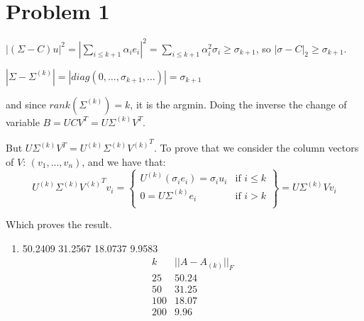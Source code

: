 \documentclass[12pt]{article}
\newenvironment{problem}[1]
{\section*{Problem #1}}{}
\begin{document}
\begin{problem}{1}
\begin{itemize}
    $|(\Sigma - C)u|^2 = |\sum_{i \le k+1} \alpha_i e_i|^2 = \sum_{i \le k+1} \alpha_i^2 \sigma_i \ge \sigma_{k+1}$, so $|\sigma - C|_2 \ge \sigma_{k+1}$.

    $|\Sigma - \Sigma^{(k)}| = |diag(0, \ldots, \sigma_{k+1}, \ldots)| = \sigma_{k+1}$

    and since $rank(\Sigma^{(k)}) = k$, it is the argmin. Doing the inverse the change of variable $B = UCV^T = U \Sigma^{(k)} V^T$.

    But $U \Sigma^{(k)} V^T = U^{(k)} \Sigma^{(k)} {V^{(k)}}^T$. To prove that we consider the column vectors of $V$: $(v_1, ..., v_n)$, and we have that:
    \[
      U^{(k)} \Sigma^{(k)} {V^{(k)}}^T v_i =
      \left \{
        \begin{array}{cc}
          U^{(k)} (\sigma_i e_i) = \sigma_i u_i &\text{if } i \le k \\
          0 = U \Sigma^{(k)}e_i   &\text{if } i > k \\
        \end{array}
      \right \}
      = U \Sigma^{(k)} V v_i
    \]
    
    Which proves the result.
  \end{itemize}



  \begin{enumerate}
  \item
    50.2409   31.2567   18.0737    9.9583
    \[
      \begin{array}{c|c}
        k & ||A - A_{(k)}||_F \\
        \hline
        25&50.24\\
        50&31.25\\
        100&18.07\\
        200&9.96\\
      \end{array}
    \]


\end{enumerate}
\end{problem}
\end{document}
